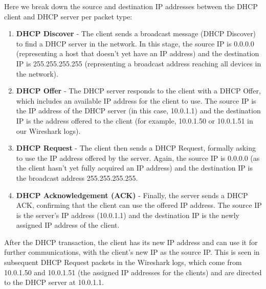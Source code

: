 Here we break down the source and destination IP addresses between the DHCP client and DHCP server per packet type:

\begin{enumerate}
    \item \textbf{DHCP Discover} - The client sends a broadcast message (DHCP Discover) to find a DHCP server in the network. In this stage, the source IP is 0.0.0.0 (representing a host that doesn't yet have an IP address) and the destination IP is 255.255.255.255 (representing a broadcast address reaching all devices in the network).
    \item \textbf{DHCP Offer} - The DHCP server responds to the client with a DHCP Offer, which includes an available IP address for the client to use. The source IP is the IP address of the DHCP server (in this case, 10.0.1.1) and the destination IP is the address offered to the client (for example, 10.0.1.50 or 10.0.1.51 in our Wireshark logs).
    \item \textbf{DHCP Request} - The client then sends a DHCP Request, formally asking to use the IP address offered by the server. Again, the source IP is 0.0.0.0 (as the client hasn't yet fully acquired an IP address) and the destination IP is the broadcast address 255.255.255.255.
    \item \textbf{DHCP Acknowledgement (ACK)} - Finally, the server sends a DHCP ACK, confirming that the client can use the offered IP address. The source IP is the server's IP address (10.0.1.1) and the destination IP is the newly assigned IP address of the client.
\end{enumerate}

After the DHCP transaction, the client has its new IP address and can use it for further communications, with the client's new IP as the source IP. This is seen in subsequent DHCP Request packets in the Wireshark logs, which come from 10.0.1.50 and 10.0.1.51 (the assigned IP addresses for the clients) and are directed to the DHCP server at 10.0.1.1.
